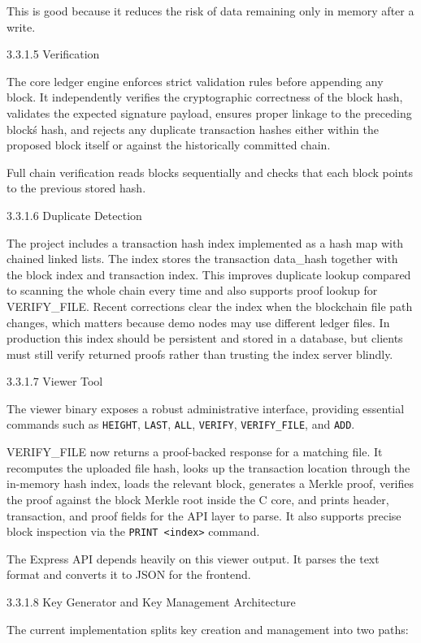\documentclass[12pt]{article}
\begin{document}
This is good because it reduces the risk of data remaining only in memory after a write.

3.3.1.5 Verification

The core ledger engine enforces strict validation rules before appending any block. It independently verifies the cryptographic correctness of the block hash, validates the expected signature payload, ensures proper linkage to the preceding block\'s hash, and rejects any duplicate transaction hashes either within the proposed block itself or against the historically committed chain.

Full chain verification reads blocks sequentially and checks that each block points to the previous stored hash.

3.3.1.6 Duplicate Detection

The project includes a transaction hash index implemented as a hash map with chained linked lists. The index stores the transaction data\_hash together with the block index and transaction index. This improves duplicate lookup compared to scanning the whole chain every time and also supports proof lookup for VERIFY\_FILE. Recent corrections clear the index when the blockchain file path changes, which matters because demo nodes may use different ledger files. In production this index should be persistent and stored in a database, but clients must still verify returned proofs rather than trusting the index server blindly.

3.3.1.7 Viewer Tool

The viewer binary exposes a robust administrative interface, providing essential commands such as \texttt{HEIGHT}, \texttt{LAST}, \texttt{ALL}, \texttt{VERIFY}, \texttt{VERIFY\_FILE}, and \texttt{ADD}.

VERIFY\_FILE now returns a proof-backed response for a matching file. It recomputes the uploaded file hash, looks up the transaction location through the in-memory hash index, loads the relevant block, generates a Merkle proof, verifies the proof against the block Merkle root inside the C core, and prints header, transaction, and proof fields for the API layer to parse.
It also supports precise block inspection via the \texttt{PRINT <index>} command.

The Express API depends heavily on this viewer output. It parses the text format and converts it to JSON for the frontend.

3.3.1.8 Key Generator and Key Management Architecture

The current implementation splits key creation and management into two paths:
\end{document}
